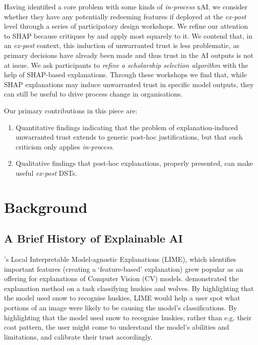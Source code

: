 Having identified a core problem with some kinds of \emph{in-process} xAI, we consider whether they have any potentially redeeming features if deployed at the \emph{ex-post} level through a series of participatory design workshops. We refine our attention to SHAP because critiques by \textcite{Lipton} and \textcite{miller_explainable_2023} apply most squarely to it. We contend that, in an \emph{ex-post} context, this induction of unwarranted trust is less problematic, as primary decisions have already been made and thus trust in the AI outputs is not at issue. We ask participants to \emph{refine a scholarship selection algorithm} with the help of SHAP-based explanations. Through these workshops we find that, while SHAP explanations may induce unwarranted trust in specific model outputs, they can still be useful to drive process change in organisations.

Our primary contributions in this piece are:

\begin{enumerate}
    \item Quantitative findings indicating that the problem of explanation-induced unwarranted trust extends to generic post-hoc justifications, but that such criticism only applies \emph{in-process}.
    \item Qualitative findings that post-hoc explanations, properly presented, can make useful \emph{ex-post} DSTs.
\end{enumerate}

\section{Background}
\subsection{A Brief History of Explainable AI}\label{ssec:history}
\textcite{ribeiro_why_2016}'s Local Interpretable Model-agnostic Explanations (LIME), which identifies important features (creating a `feature-based' explanation) grew popular as an offering for explanations of Computer Vision (CV) models. \textcite{ribeiro_why_2016} demonstrated the explanation method on a task classifying huskies and wolves. By highlighting that the model used snow to recognise huskies, LIME would help a user spot what portions of an image were likely to be causing the model's classifications. By highlighting that the model used snow to recognise huskies, rather than e.g. their coat pattern, the user might come to understand the model's abilities and limitations, and calibrate their trust accordingly.

